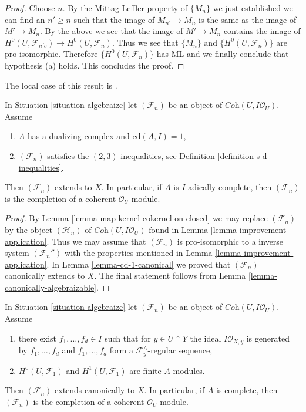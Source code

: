 \begin{proof}
\medskip\noindent
Choose $n$. By the Mittag-Leffler property of $\{M_n\}$ we just established
we can find an $n' \geq n$ such that the image of $M_{n'} \to M_n$
is the same as the image of $M' \to M_n$. By the above we see that
the image of $M' \to M_n$ contains the image of
$H^0(U, \mathcal{F}_{n'c}) \to H^0(U, \mathcal{F}_n)$.
Thus we see that $\{M_n\}$ and $\{H^0(U, \mathcal{F}_n)\}$
are pro-isomorphic. Therefore $\{H^0(U, \mathcal{F}_n)\}$
has ML and we finally conclude that hypothesis (a) holds.
This concludes the proof.
\end{proof}

\begin{proposition}
\label{proposition-cd-1}
\begin{reference}
The local case of this result is \cite[IV Corollaire 2.9]{MRaynaud-book}.
\end{reference}
In Situation \ref{situation-algebraize} let $(\mathcal{F}_n)$
be an object of $\textit{Coh}(U, I\mathcal{O}_U)$. Assume
\begin{enumerate}
\item $A$ has a dualizing complex and $\text{cd}(A, I) = 1$,
\item $(\mathcal{F}_n)$ satisfies the $(2, 3)$-inequalities, see
Definition \ref{definition-s-d-inequalities}.
\end{enumerate}
Then $(\mathcal{F}_n)$ extends to $X$. In particular, if $A$ is
$I$-adically complete, then $(\mathcal{F}_n)$ is the completion
of a coherent $\mathcal{O}_U$-module.
\end{proposition}

\begin{proof}
By Lemma \ref{lemma-map-kernel-cokernel-on-closed}
we may replace $(\mathcal{F}_n)$ by the object $(\mathcal{H}_n)$
of $\textit{Coh}(U, I\mathcal{O}_U)$ found in
Lemma \ref{lemma-improvement-application}.
Thus we may assume that $(\mathcal{F}_n)$ is pro-isomorphic
to a inverse system $(\mathcal{F}_n'')$ with the properties
mentioned in Lemma \ref{lemma-improvement-application}.
In Lemma \ref{lemma-cd-1-canonical} we proved that
$(\mathcal{F}_n)$ canonically extends to $X$.
The final statement follows from Lemma \ref{lemma-canonically-algebraizable}.
\end{proof}

\begin{proposition}
\label{proposition-algebraization-regular-sequence}
In Situation \ref{situation-algebraize} let
$(\mathcal{F}_n)$ be an object of $\textit{Coh}(U, I\mathcal{O}_U)$.
Assume
\begin{enumerate}
\item there exist $f_1, \ldots, f_d \in I$ such that
for $y \in U \cap Y$ the ideal $I\mathcal{O}_{X, y}$
is generated by $f_1, \ldots, f_d$ and
$f_1, \ldots, f_d$ form a $\mathcal{F}_y^\wedge$-regular sequence,
\item $H^0(U, \mathcal{F}_1)$ and $H^1(U, \mathcal{F}_1)$
are finite $A$-modules.
\end{enumerate}
Then $(\mathcal{F}_n)$ extends canonically to $X$. In particular, if $A$
is complete, then $(\mathcal{F}_n)$ is the completion of a coherent
$\mathcal{O}_U$-module.
\end{proposition}

